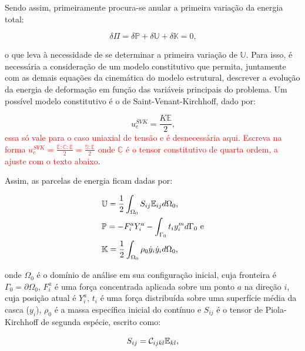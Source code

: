 Sendo assim, primeiramente procura-se anular a primeira variação da energia total:

\begin{equation}
    \delta\Pi=\delta\mathbb{P}+\delta\mathbb{U}+\delta\mathbb{K}=0\text{,}
\end{equation}

\noindent o que leva à necessidade de se determinar a primeira variação de $\mathbb{U}$. Para isso, é necessária a consideração de um modelo constitutivo que permita, juntamente com as demais equações da cinemática do modelo estrutural, descrever a evolução da energia de deformação em função das variáveis principais do problema. Um possível modelo constitutivo é o de Saint-Venant-Kirchhoff, dado por:

\begin{equation}
    u_e^{SVK}=\frac{K\mathbb{E}}{2}\text{,}
\end{equation}
\textcolor{red}{essa só vale para o caso uniaxial de tensão e é desnecessária aqui. Escreva na forma    $u_e^{SVK}=\frac{\mathbb{E}:\mathbb{C}:\mathbb{E}}{2}=\frac{\mathbb{S}:\mathbb{E}}{2}$ onde $\mathbb{C}$ é o tensor constitutivo de quarta ordem, a ajuste com o texto abaixo}.

Assim, as parcelas de energia ficam dadas por:

\begin{subequations}
    \begin{align}
         & \mathbb{U}=\frac{1}{2}\int_{\Omega_0}{S_{ij}\mathbb{E}_{ij} d\Omega_0}\text{,}    \\
         & \mathbb{P}=-F_i^aY_i^a-\int_{\Gamma_0}{t_iy_i^m d\Gamma_0}\text{ e}             \\
         & \mathbb{K}=\frac{1}{2}\int_{\Omega_0}{\rho_0\dot{y}_i\dot{y}_i d\Omega_0}\text{,}
    \end{align}
\end{subequations}

\noindent onde $\Omega_0$ é o domínio de análise em sua configuração inicial, cuja fronteira é $\Gamma_0=\partial\Omega_0$, $F_i^a$ é uma força concentrada aplicada sobre um ponto $a$ na direção $i$, cuja posição atual é $Y_i^a$, $t_i$ é uma força distribuída sobre uma superfície média da casca ($y_i$), $\rho_0$ é a massa específica inicial do contínuo e  $S_{ij}$ é o tensor de Piola-Kirchhoff de segunda espécie, escrito como:

\begin{equation}
    S_{ij}=\mathcal{C}_{ijkl}\mathbb{E}_{kl}\text{,}
    \label{eq:CSD-S}
\end{equation}

